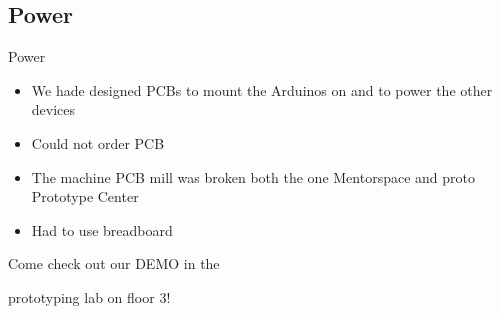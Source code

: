 \documentclass{beamer}
\begin{document}
\subsection{Power}
\begin{frame}{Power}
    \begin{itemize}
        \item We hade designed PCBs to mount the Arduinos on and to power the other devices
        \item Could not order PCB
        \item The machine PCB mill was broken both the one Mentorspace and proto Prototype Center
        \item Had to use breadboard 
    \end{itemize}
\end{frame}











\begin{frame}
    \Huge{\centerline{Come check out our DEMO in the}} 
    \Huge{\centerline{prototyping lab on floor 3!}} 
\end{frame}


        
\end{document}
